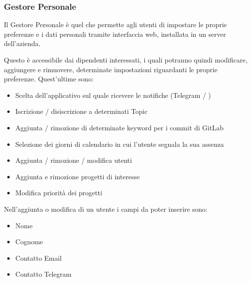 

	\subsubsection{Gestore Personale}\label{TecnologieGestorePersonale}
	Il Gestore Personale è quel  che permette agli utenti di impostare le
	proprie preferenze e i dati personali tramite interfaccia web, installata in un server dell'azienda.

	Questo è accessibile dai dipendenti interessati, i quali potranno quindi modificare, aggiungere e rimuovere, determinate impostazioni riguardanti le proprie
	preferenze. Quest'ultime sono:
	\begin{itemize}
		\item Scelta dell'applicativo sul quale ricevere le notifiche (Telegram / \mail)
		\item Iscrizione / disiscrizione a determinati Topic
		\item Aggiunta / rimozione di determinate keyword per i commit di GitLab
		\item Selezione dei giorni di calendario in cui l'utente segnala la sua assenza
		\item Aggiunta / rimozione / modifica utenti
        \item Aggiunta e rimozione progetti di interesse
        \item Modifica priorità dei progetti
	\end{itemize}

    Nell'aggiunta o modifica di un utente i campi da poter inserire sono:
    \begin{itemize}
        \item Nome
        \item Cognome
        \item Contatto Email
        \item Contatto Telegram
    \end{itemize}

